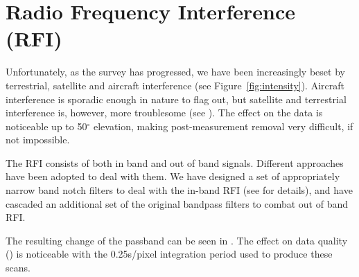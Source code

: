 \section{Radio Frequency Interference (RFI)}

Unfortunately, as the survey has progressed, we have been increasingly beset by terrestrial, satellite and aircraft interference (see Figure~\ref{fig:intensity}). Aircraft interference is sporadic enough in nature to flag out, but satellite and terrestrial interference is, however, more troublesome (see ). The effect on the data is noticeable up to 50$^{\circ}$ elevation, making post-measurement removal very difficult, if not impossible.

The RFI consists of both in band and out of band signals. Different approaches have been adopted to deal with them. We have designed a set of appropriately narrow band notch filters to deal with the in-band RFI (see  for details), and have cascaded an additional set of the original bandpass filters to combat out of band RFI.

 The resulting change of the passband can be seen in . The effect on data quality () is noticeable with the 0.25s/pixel integration period used to produce these scans.



